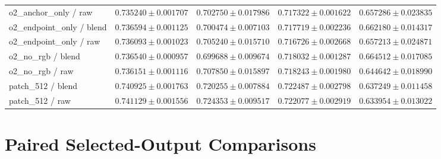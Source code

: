 \documentclass[jimaging,article,submit,pdftex,moreauthors]{Definitions/mdpi}
\begin{document}
\begin{longtable}{@{}>{\raggedright\arraybackslash}p{5.0cm}>{\raggedright\arraybackslash}p{2.5cm}>{\raggedright\arraybackslash}p{2.5cm}>{\raggedright\arraybackslash}p{2.5cm}>{\raggedright\arraybackslash}p{2.5cm}@{}}
o2\_anchor\_only / raw & $0.735240\pm 0.001707$ & $0.702750\pm 0.017986$ & $0.717322\pm 0.001622$ & $0.657286\pm 0.023835$\\
o2\_endpoint\_only / blend & $0.736594\pm 0.001125$ & $0.700474\pm 0.007103$ & $0.717719\pm 0.002236$ & $0.662180\pm 0.014317$\\
o2\_endpoint\_only / raw & $0.736093\pm 0.001023$ & $0.705240\pm 0.015710$ & $0.716726\pm 0.002668$ & $0.657213\pm 0.024871$\\
o2\_no\_rgb / blend & $0.736540\pm 0.000957$ & $0.699688\pm 0.009674$ & $0.718032\pm 0.001287$ & $0.664512\pm 0.017085$\\
o2\_no\_rgb / raw & $0.736151\pm 0.001116$ & $0.707850\pm 0.015897$ & $0.718243\pm 0.001980$ & $0.644642\pm 0.018990$\\
patch\_512 / blend & $0.740925\pm 0.001763$ & $0.720255\pm 0.007884$ & $0.722487\pm 0.002798$ & $0.637249\pm 0.011458$\\
patch\_512 / raw & $0.741129\pm 0.001556$ & $0.724353\pm 0.009517$ & $0.722077\pm 0.002919$ & $0.633954\pm 0.013022$\\
\end{longtable}\endgroup
\clearpage
\section{Paired Selected-Output Comparisons}
\end{document}
